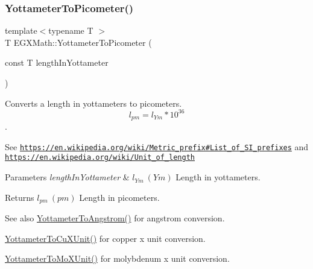 \subsubsection{\texorpdfstring{Yottameter\+To\+Picometer()}{YottameterToPicometer()}}
{\footnotesize\ttfamily template$<$typename T $>$ \\
T E\+G\+X\+Math\+::\+Yottameter\+To\+Picometer (\begin{DoxyParamCaption}\item[{const T}]{length\+In\+Yottameter }\end{DoxyParamCaption})}



Converts a length in yottameters to picometers. \[ l_{pm}=l_{Ym} * 10^{36} \]. 

See \href{https://en.wikipedia.org/wiki/Metric_prefix#List_of_SI_prefixes}{\tt https\+://en.\+wikipedia.\+org/wiki/\+Metric\+\_\+prefix\#\+List\+\_\+of\+\_\+\+S\+I\+\_\+prefixes} and \href{https://en.wikipedia.org/wiki/Unit_of_length}{\tt https\+://en.\+wikipedia.\+org/wiki/\+Unit\+\_\+of\+\_\+length} 
\begin{DoxyParams}{Parameters}
{\em length\+In\+Yottameter} & $ l_{Ym}\ (Ym)$ Length in yottameters. \\
\hline
\end{DoxyParams}
\begin{DoxyReturn}{Returns}
$ l_{pm}\ (pm)$ Length in picometers. 
\end{DoxyReturn}
\begin{DoxySeeAlso}{See also}
\mbox{\hyperlink{group___e_g_x_math-_conversions-_length_conversions-_s_i-_yottameter-_non-_s_i_ga0129b788ceb2d7d4ce86c155ee9d4675}{Yottameter\+To\+Angstrom()}} for angstrom conversion. 

\mbox{\hyperlink{group___e_g_x_math-_conversions-_length_conversions-_s_i-_yottameter-_non-_s_i_ga5c8a9868ad238225dbf8ebdbfad13930}{Yottameter\+To\+Cu\+X\+Unit()}} for copper x unit conversion. 

\mbox{\hyperlink{group___e_g_x_math-_conversions-_length_conversions-_s_i-_yottameter-_non-_s_i_ga545da9526f7a62f5ca7d1800faf17d1d}{Yottameter\+To\+Mo\+X\+Unit()}} for molybdenum x unit conversion. 
\end{DoxySeeAlso}
\mbox{\label{group___e_g_x_math-_conversions-_length_conversions-_s_i-_yottameter-_s_i_ga24c70c7a3a5081e794d7cf4a37264b6c}} 
